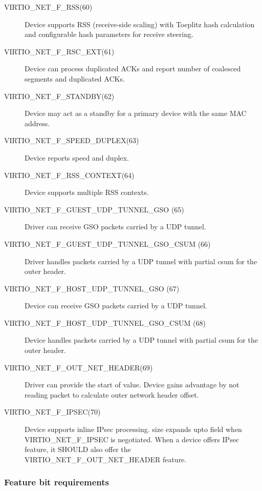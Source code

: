 \begin{description}
\item[VIRTIO_NET_F_RSS(60)] Device supports RSS (receive-side scaling)
    with Toeplitz hash calculation and configurable hash
    parameters for receive steering.

\item[VIRTIO_NET_F_RSC_EXT(61)] Device can process duplicated ACKs
    and report number of coalesced segments and duplicated ACKs.

\item[VIRTIO_NET_F_STANDBY(62)] Device may act as a standby for a primary
    device with the same MAC address.

\item[VIRTIO_NET_F_SPEED_DUPLEX(63)] Device reports speed and duplex.

\item[VIRTIO_NET_F_RSS_CONTEXT(64)] Device supports multiple RSS contexts.

\item[VIRTIO_NET_F_GUEST_UDP_TUNNEL_GSO (65)] Driver can receive GSO packets
  carried by a UDP tunnel.

\item[VIRTIO_NET_F_GUEST_UDP_TUNNEL_GSO_CSUM (66)] Driver handles packets
  carried by a UDP tunnel with partial csum for the outer header.

\item[VIRTIO_NET_F_HOST_UDP_TUNNEL_GSO (67)] Device can receive GSO packets
  carried by a UDP tunnel.

\item[VIRTIO_NET_F_HOST_UDP_TUNNEL_GSO_CSUM (68)] Device handles packets
  carried by a UDP tunnel with partial csum for the outer header.

\item[VIRTIO_NET_F_OUT_NET_HEADER(69)] Driver can provide the start of
  value. Device gains advantage by not reading packet
  to calculate outer network header offset.

\item[VIRTIO_NET_F_IPSEC(70)] Device supports inline IPsec processing.
  size expands upto field 
 when VIRTIO_NET_F_IPSEC is negotiated. When a device offers IPsec feature, it SHOULD
 also offer the VIRTIO_NET_F_OUT_NET_HEADER feature.

\end{description}

\subsubsection{Feature bit requirements}\label{sec:Device Types / Network Device / Feature bits / Feature bit requirements}


